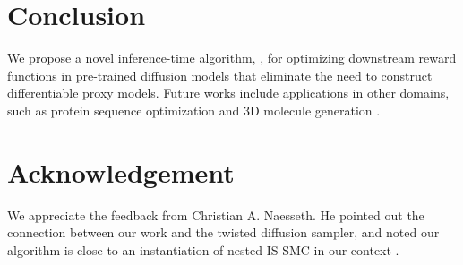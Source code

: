 \vspace{-3mm}
\section{Conclusion}
\vspace{-2mm}
We propose a novel inference-time algorithm, \alg, for optimizing downstream reward functions in pre-trained diffusion models that eliminate the need to construct differentiable proxy models. Future works include applications in other domains, such as protein sequence optimization \citep{gruver2023protein,alamdari2023protein,watson2023novo} and 3D molecule generation \citep{xu2023geometric}.  



\section*{Acknowledgement} 

We appreciate the feedback from Christian A. Naesseth. He pointed out the connection between our work and the twisted diffusion sampler, and noted our algorithm is close to an instantiation of nested-IS SMC in our context \citep{naesseth2019elements,naesseth2015nested}.
